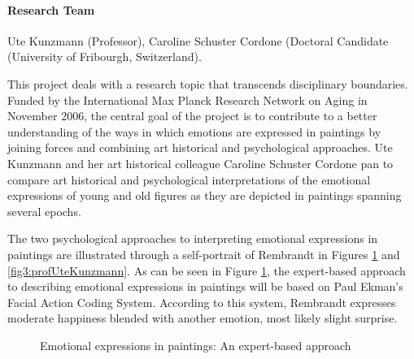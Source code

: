
\paragraph{Research Team}
Ute Kunzmann (Professor), Caroline Schuster Cordone (Doctoral Candidate (University of Fribourgh, Switzerland).

 This project deals with a research topic that transcends disciplinary boundaries. Funded by the International Max Planck Research Network on Aging in November 2006, the central goal of the project is to contribute to a better understanding of the ways in which emotions are expressed in paintings by joining forces and combining art historical and psychological approaches. Ute Kunzmann and her art historical colleague Caroline Schuster Cordone pan to compare art historical and psychological interpretations of the emotional expressions of young and old figures as they are depicted in paintings spanning several epochs. 

 The two psychological approaches to interpreting emotional expressions in paintings are illustrated through a self-portrait of Rembrandt in Figures \ref{fig2:profUteKunzmann} and \ref{fig3:profUteKunzmann}. As can be seen in Figure \ref{fig2:profUteKunzmann}, the expert-based approach to describing emotional expressions in paintings will be based on Paul Ekman's Facial Action Coding System. According to this system, Rembrandt expresses moderate happiness blended with another emotion, most likely slight surprise. 

\begin{figure}[htb]
  \begin{center}
    \caption{Emotional expressions in paintings: An expert-based approach}
    \label{fig2:profUteKunzmann}
  \end{center}
\end{figure}

